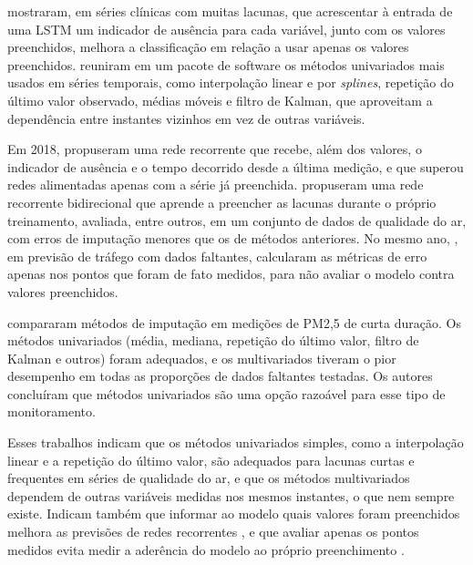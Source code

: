  mostraram, em séries clínicas com muitas lacunas, que acrescentar à entrada de uma LSTM um indicador de ausência para cada variável, junto com os valores preenchidos, melhora a classificação em relação a usar apenas os valores preenchidos.  reuniram em um pacote de software os métodos univariados mais usados em séries temporais, como interpolação linear e por \textit{splines}, repetição do último valor observado, médias móveis e filtro de Kalman, que aproveitam a dependência entre instantes vizinhos em vez de outras variáveis.

Em 2018,  propuseram uma rede recorrente que recebe, além dos valores, o indicador de ausência e o tempo decorrido desde a última medição, e que superou redes alimentadas apenas com a série já preenchida.  propuseram uma rede recorrente bidirecional que aprende a preencher as lacunas durante o próprio treinamento, avaliada, entre outros, em um conjunto de dados de qualidade do ar, com erros de imputação menores que os de métodos anteriores. No mesmo ano, , em previsão de tráfego com dados faltantes, calcularam as métricas de erro apenas nos pontos que foram de fato medidos, para não avaliar o modelo contra valores preenchidos.

 compararam métodos de imputação em medições de PM2,5 de curta duração. Os métodos univariados (média, mediana, repetição do último valor, filtro de Kalman e outros) foram adequados, e os multivariados tiveram o pior desempenho em todas as proporções de dados faltantes testadas. Os autores concluíram que métodos univariados são uma opção razoável para esse tipo de monitoramento.

Esses trabalhos indicam que os métodos univariados simples, como a interpolação linear e a repetição do último valor, são adequados para lacunas curtas e frequentes em séries de qualidade do ar, e que os métodos multivariados dependem de outras variáveis medidas nos mesmos instantes, o que nem sempre existe. Indicam também que informar ao modelo quais valores foram preenchidos melhora as previsões de redes recorrentes \cite{lipton2016directly,che2018recurrent}, e que avaliar apenas os pontos medidos evita medir a aderência do modelo ao próprio preenchimento \cite{li2018dcrnn}.
